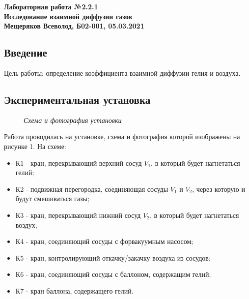 \documentclass[a4paper, fontsize = 14pt]{article}
\begin{document}
 
\begin{center} \large\textbf{
Лабораторная работа №2.2.1 \\ Исследование взаимной диффузии газов \\
Мещеряков Всеволод, Б02-001, 05.03.2021}
\end{center} 

\subsection*{Введение}

Цель работы: определение коэффициента взаимной диффузии гелия и воздуха.

\subsection*{Экспериментальная установка}

\begin{figure}[hbt]
\caption{\textit{Схема и фотография установки}}
\end{figure}

Работа проводилась на установке, схема и фотография которой изображены на рисунке 1. На схеме: 

\begin{itemize}
  \item К1 - кран, перекрывающий верхний сосуд $V_1$, в который будет нагнетаться гелий;
  \item К2 - подвижная перегородка, соединяющая сосуды $V_1$ и $V_2$, через которую и будут смешиваться газы;
  \item К3 - кран, перекрывающий нижний сосуд $V_2$, в который будет нагнетаться воздух;
  \item К4 - кран, соединяющий сосуды с форвакуумным насосом;
  \item К5 - кран, контролирующий откачку/закачку воздуха из сосудов;	  \item К6 - кран, соединяющий сосуды с баллоном, содержащим гелий;
  \item К7 - кран баллона, содержащего гелий.
\end{itemize}
\end{document}
